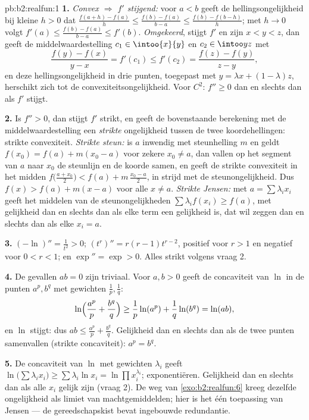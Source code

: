\begin{solution}{pb:b2:realfun:1}
\textbf{1.} \emph{Convex $\Rightarrow$ $f'$ stijgend:} voor $a < b$
geeft de hellingsongelijkheid bij kleine $h > 0$ dat
$\frac{f(a+h) - f(a)}h \leq \frac{f(b) - f(a)}{b-a} \leq
\frac{f(b) - f(b-h)}{h}$; met $h \to 0$ volgt $f'(a) \leq
\frac{f(b) - f(a)}{b - a} \leq f'(b)$. \emph{Omgekeerd}, stijgt
$f'$ en zijn $x < y < z$, dan geeft de middelwaardestelling $c_1
\in \intoo{x}{y}$ en $c_2 \in \intoo yz$ met
\[
\frac{f(y) - f(x)}{y - x} = f'(c_1) \leq f'(c_2)
= \frac{f(z) - f(y)}{z - y},
\]
en deze hellingsongelijkheid in drie punten, toegepast met $y =
\lambda x + (1 - \lambda)z$, herschikt zich tot de
convexiteitsongelijkheid. Voor $C^2$: $f'' \geq 0$ dan en slechts
dan als $f'$ stijgt.

\textbf{2.} Is $f'' > 0$, dan stijgt $f'$ strikt, en geeft de
bovenstaande berekening met de middelwaardestelling een
\emph{strikte} ongelijkheid tussen de twee koordehellingen: strikte
convexiteit. \emph{Strikte steun:} is $a$ inwendig met steunhelling
$m$ en geldt $f(x_0) = f(a) + m(x_0 - a)$ voor zekere $x_0 \neq a$,
dan vallen op het segment van $a$ naar $x_0$ de steunlijn en de
koorde samen, en geeft de strikte convexiteit in het midden
$f\bigl(\frac{a + x_0}2\bigr) < f(a) + m\,\frac{x_0 - a}2$, in
strijd met de steunongelijkheid. Dus $f(x) > f(a) + m(x - a)$ voor
alle $x \neq a$. \emph{Strikte Jensen:} met $a = \sum\lambda_ix_i$
geeft het middelen van de steunongelijkheden $\sum\lambda_if(x_i)
\geq f(a)$, met gelijkheid dan en slechts dan als elke term een
gelijkheid is, dat wil zeggen dan en slechts dan als elke $x_i =
a$.

\textbf{3.} $(-\ln)'' = \frac1{t^2} > 0$; $(t^r)'' = r(r -
1)t^{r-2}$, positief voor $r > 1$ en negatief voor $0 < r < 1$; en
$\exp'' = \exp > 0$. Alles strikt volgens vraag 2.

\textbf{4.} De gevallen $ab = 0$ zijn triviaal. Voor $a, b > 0$
geeft de concaviteit van $\ln$ in de punten $a^p, b^q$ met
gewichten $\frac1p, \frac1q$:
\[
\ln\Bigl(\frac{a^p}p + \frac{b^q}q\Bigr) \geq
\frac1p\ln(a^p) + \frac1q\ln(b^q) = \ln(ab),
\]
en $\ln$ stijgt: dus $ab \leq \frac{a^p}p + \frac{b^q}q$.
Gelijkheid dan en slechts dan als de twee punten samenvallen
(strikte concaviteit): $a^p = b^q$.

\textbf{5.} De concaviteit van $\ln$ met gewichten $\lambda_i$
geeft $\ln\bigl(\sum\lambda_ix_i\bigr) \geq \sum\lambda_i\ln x_i =
\ln\prod x_i^{\lambda_i}$; exponentiëren. Gelijkheid dan en slechts
dan als alle $x_i$ gelijk zijn (vraag 2). De weg van
\cref{exo:b2:realfun:6} kreeg dezelfde ongelijkheid als limiet van
machtgemiddelden; hier is het één toepassing van Jensen --- de
gereedschapskist bevat ingebouwde redundantie.


\end{solution}
